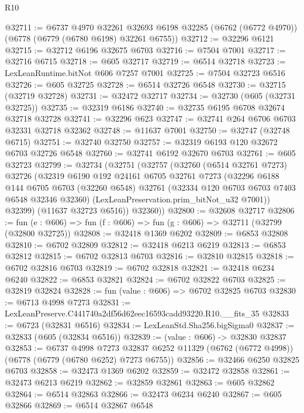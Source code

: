\begin{lexlean}{R10}
\begin{coremodule}
@32711 := @6737
    @4970
    @32261
    @32693
    @6198
    @32285
    (@6762 (@6772 @4970))
    (@6778 (@6779 (@6780 @6198) @32261 @6755))
@32712 := @32296 @6121
@32715 := @32712 @6196 @32675 @6703
@32716 := @7504 @7001
@32717 := @32716 @6715
@32718 := @605 @32717
@32719 := @6514 @32718
@32723 := LexLeanRuntime.bitNot @606 @7257 @7001
@32725 := @7504 @32723 @6516
@32726 := @605 @32725
@32728 := @6514 @32726 @6548
@32730 := @32715 (@32719 @32728)
@32731 := @32472 @32717
@32734 := @32730 (@605 (@32731 @32725))
@32735 := @32319 @6186
@32740 := @32735 @6195 @6708 @32674 @32718 @32728
@32741 := @32296 @623
@32747 := @32741 @264 @6706 @6703 @32331 @32718 @32362
@32748 := @11637 @7001
@32750 := @32747 (@32748 @6715)
@32751 := @32740 @32750
@32757 := @32319 @6193 @120 @32672 @6703 @32726 @6548
@32760 := @32741 @6192 @32670 @6703
@32761 := @605 @32723
@32799 := @32734
    (@32751
      (@32757
        (@32760
          (@6514 @32761 @7273)
          @32726
          (@32319
            @6190
            @192
            @24161
            @6705
            @32761
            @7273
            (@32296
              @6188
              @144
              @6705
              @6703
              (@32260 @6548)
              @32761
              (@32334 @120 @6703 @6703 @7403 @6548 @32346 @32360)
              (LexLeanPreservation.prim_bitNot_u32 @7001))
            @32399)
          (@11637 @32723 @6516))
        @32360))
@32800 := @32608 @32717
@32806 := fun (e : @606) => fun (f : @606) => fun (g : @606) => @32711 (@32799 (@32800 @32725))
@32808 := @32418 @1369 @6202
@32809 := @6853 @32808
@32810 := @6702 @32809
@32812 := @32418 @6213 @6219
@32813 := @6853 @32812
@32815 := @6702 @32813 @6703
@32816 := @32810 @32815
@32818 := @6702 @32816 @6703
@32819 := @6702 @32818
@32821 := @32418 @6234 @6240
@32822 := @6853 @32821
@32824 := @6702 @32822 @6703
@32825 := @32819 @32824
@32828 := fun (value : @606) => @6702 @32825 @6703
@32830 := @6713 @4998 @7273
@32831 := LexLeanPreserve.C441740a2df56d62eec16593cadd93220.R10.__fits_35
@32833 := @6723 (@32831 @6516)
@32834 := LexLeanStd.Sha256.bigSigma0
@32837 := @32833 (@605 (@32834 @6516))
@32839 := (value : @606) -> @32830 @32837
@32853 := @6737
    @4998
    @7273
    @32837
    @6252
    @11329
    (@6762 (@6772 @4998))
    (@6778 (@6779 (@6780 @6252) @7273 @6755))
@32856 := @32466 @6250 @32825 @6703
@32858 := @32473 @1369 @6202
@32859 := @32472 @32858
@32861 := @32473 @6213 @6219
@32862 := @32859 @32861
@32863 := @605 @32862
@32864 := @6514 @32863
@32866 := @32473 @6234 @6240
@32867 := @605 @32866
@32869 := @6514 @32867 @6548

\end{coremodule}
\end{lexlean}
